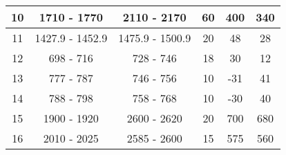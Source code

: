 \begin{table}[]
\begin{tabular}{|c|c|c|c|c|c|}
10                                                          & 1710 - 1770                                            & 2110 - 2170                                              & 60                                                                   & 400                                                              & 340                                                         \\ \hline
11                                                          & 1427.9 - 1452.9                                        & 1475.9 - 1500.9                                          & 20                                                                   & 48                                                               & 28                                                          \\ \hline
12                                                          & 698 - 716                                              & 728 - 746                                                & 18                                                                   & 30                                                               & 12                                                          \\ \hline
13                                                          & 777 - 787                                              & 746 - 756                                                & 10                                                                   & -31                                                              & 41                                                          \\ \hline
14                                                          & 788 - 798                                              & 758 - 768                                                & 10                                                                   & -30                                                              & 40                                                          \\ \hline
15                                                          & 1900 - 1920                                            & 2600 - 2620                                              & 20                                                                   & 700                                                              & 680                                                         \\ \hline
16                                                          & 2010 - 2025                                            & 2585 - 2600                                              & 15                                                                   & 575                                                              & 560                                                         \\ \hline

\end{tabular}
\end{table}
